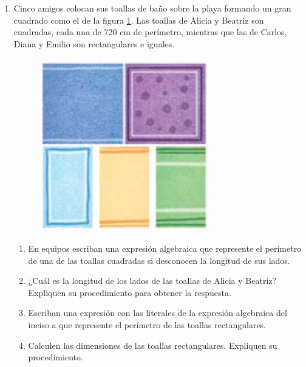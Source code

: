 \documentclass[11pt]{book}
\begin{document}
\begin{enumerate}
  \item  Cinco amigos colocan sus toallas de baño sobre la playa formando un gran cuadrado como el de la figura \ref{fig:toallas}.
        Las toallas de Alicia y Beatriz son cuadradas, cada
        una de 720 cm de perímetro, mientras que las de Carlos, Diana y Emilio son rectangulares e iguales.
        \begin{minipage}{0.25\textwidth}
          \begin{figure}[H]
            \centering
            \includegraphics[width=\linewidth]{toallas.png}
            \label{fig:toallas}
          \end{figure}
        \end{minipage}\hfill
        \begin{minipage}{0.65\textwidth}
          \begin{enumerate}
            \item En equipos escriban una expresión algebraica que represente el perímetro de una de las toallas cuadradas si desconocen la longitud de sus lados.
            \item ¿Cuál es la longitud de los lados de las toallas de Alicia y Beatriz? Expliquen su procedimiento para obtener la respuesta.
            \item Escriban una expresión con las literales de la expresión algebraica del inciso a que represente el perímetro de las toallas rectangulares.
            \item Calculen las dimensiones de las toallas rectangulares. Expliquen su procedimiento.
          \end{enumerate}
        \end{minipage}

\end{enumerate}
\end{document}

